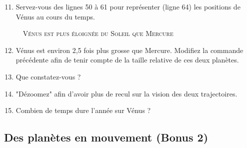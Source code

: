 \documentclass[12pt]{article}
\begin{document}
\begin{enumerate}
\setcounter{enumi}{10}
\item\app \ar \com Servez-vous des lignes 50 à 61 pour représenter (ligne 64) les positions de Vénus au cours du temps.

\begin{center}
\danger \ \ \textsc{Vénus est plus éloignée du Soleil que Mercure}\ \ \danger                                                                            \end{center}

\cpdepce



 \begin{center}
\end{center}



\item \rea \com Vénus est environ 2,5 fois plus grosse que Mercure. Modifiez la commande précédente afin de tenir compte de la taille relative de ces deux planètes. 

\item \ar Que constatez-vous ? %


\item \com "Dézoomez" afin d'avoir plus de recul sur la vision des deux trajectoires. \cpdepce%

 \begin{center}
\end{center}



\item \ar Combien de temps dure l'année sur Vénus ? %


\end{enumerate}







 \bigskip



\subsection{Des planètes en mouvement (Bonus 2)}
\end{document}
